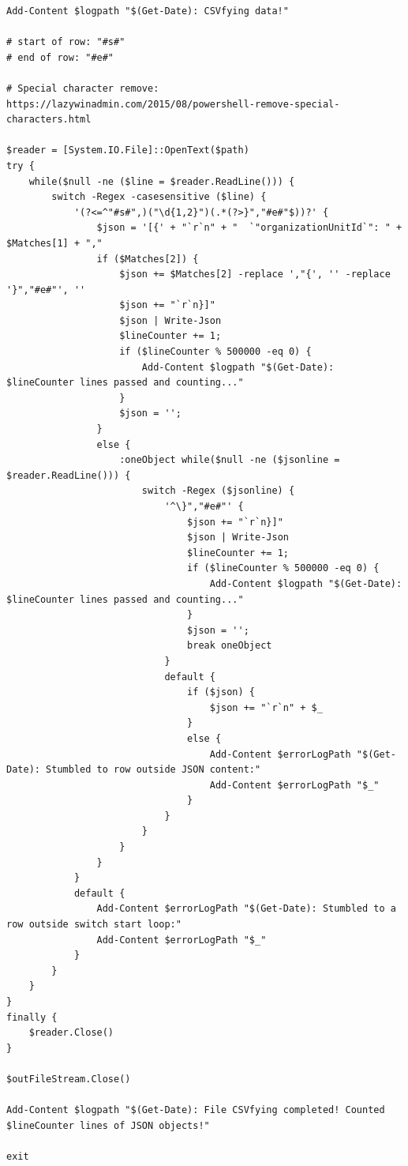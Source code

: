 \begin{Verbatim}[fontsize=\tiny]
Add-Content $logpath "$(Get-Date): CSVfying data!"

# start of row: "#s#"
# end of row: "#e#"

# Special character remove: https://lazywinadmin.com/2015/08/powershell-remove-special-characters.html

$reader = [System.IO.File]::OpenText($path)
try {
    while($null -ne ($line = $reader.ReadLine())) {
        switch -Regex -casesensitive ($line) {
            '(?<=^"#s#",)("\d{1,2}")(.*(?>}","#e#"$))?' {
                $json = '[{' + "`r`n" + "  `"organizationUnitId`": " + $Matches[1] + ","
                if ($Matches[2]) {
                    $json += $Matches[2] -replace ',"{', '' -replace '}","#e#"', ''
                    $json += "`r`n}]"
                    $json | Write-Json
                    $lineCounter += 1;
                    if ($lineCounter % 500000 -eq 0) {
                        Add-Content $logpath "$(Get-Date): $lineCounter lines passed and counting..."
                    }
                    $json = '';
                }
                else {
                    :oneObject while($null -ne ($jsonline = $reader.ReadLine())) {
                        switch -Regex ($jsonline) {
                            '^\}","#e#"' {
                                $json += "`r`n}]"
                                $json | Write-Json
                                $lineCounter += 1;
                                if ($lineCounter % 500000 -eq 0) {
                                    Add-Content $logpath "$(Get-Date): $lineCounter lines passed and counting..."
                                }
                                $json = '';
                                break oneObject
                            }
                            default {
                                if ($json) {
                                    $json += "`r`n" + $_
                                }
                                else {
                                    Add-Content $errorLogPath "$(Get-Date): Stumbled to row outside JSON content:"
                                    Add-Content $errorLogPath "$_"
                                }
                            }
                        }
                    }
                }
            }
            default {
                Add-Content $errorLogPath "$(Get-Date): Stumbled to a row outside switch start loop:"
                Add-Content $errorLogPath "$_"
            }
        }
    }
}
finally {
    $reader.Close()
}

$outFileStream.Close()

Add-Content $logpath "$(Get-Date): File CSVfying completed! Counted $lineCounter lines of JSON objects!"

exit

\end{Verbatim}



